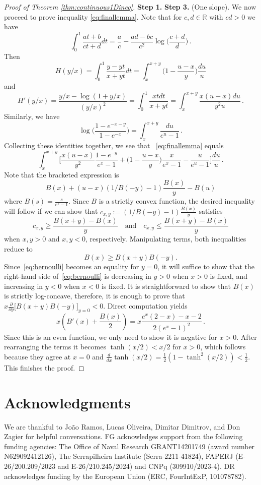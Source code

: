 \documentclass[a4paper,reqno,12pt]{amsart}
\renewcommand{\r}{\mathbb{R}}
\newcommand{\1}{\bo{1}}
\begin{document}
\begin{proof}[Proof of Theorem \ref{thm:continuous1Dineq}] {\bf Step 1. }
{\bf Step 3. }(One slope).
We now proceed to prove inequality \eqref{eq:finallemma}.
	Note that for $c,d\in \r$ with $cd>0$ we have
	\[\int_{0}^{1}\frac{at+b}{ct+d}dt = \frac{a}{c}-\frac{ad-bc}{c^2}\log\Big(\frac{c+d}{d}\Big)\,.\]
	Then
	\[H(y/x)=\int_{0}^{1}\frac{y-yt}{x+yt}dt = \int_{x}^{x+y}\Big(1-\frac{u-x}{y}\Big)\frac{du}{u}\]
	and 
	\[H'(y/x) = \frac{y/x-\log(1+y/x)}{(y/x)^2} = \int_{0}^{1}\frac{xtdt}{x+yt} = \int_{x}^{x+y}\frac{x(u-x)du}{y^2u}\,.\]
	Similarly, we have
	\[\log\Big(\frac{1-e^{-x-y}}{1-e^{-x}}\Big) = \int_{x}^{x+y}\frac{du}{e^u-1}\,.\]
	Collecting these identities together, we see that ~\eqref{eq:finallemma} equals
	\[\int_{x}^{x+y}\Big[\frac{x(u-x)}{y^2}\frac{1-e^{-y}}{e^x-1} + \Big(1-\frac{u-x}{y}\Big)\frac{x}{e^x-1}- \frac{u}{e^u-1}\Big]\frac{du}{u}\,.\]
	Note that the bracketed expression is
	\[
	B(x)+(u-x)\left(1/B(-y)-1\right)\frac{B(x)}{y}-B(u)
	\]
	where $B(s)=\frac{s}{e^s-1}$. Since $B$ is a strictly convex function, the desired inequality will follow if we can show that $c_{x,y}:=\left(1/B(-y)-1\right)\frac{B(x)}{y}$ satisfies
	\[
		c_{x,y} \geq \frac{B(x+y)-B(x)}{y}  \quad \text{and}\quad c_{x,y} \leq \frac{B(x+y)-B(x)}{y}
	\]
	when $x,y>0$ and $x,y<0$, respectively. Manipulating terms, both inequalities reduce to
	\begin{equation} \label{eq:bernoulli}
		B(x) \geq B(x+y)B(-y).
	\end{equation}
	Since~\eqref{eq:bernoulli} becomes an equality for $y=0$, it will suffice to show that the right-hand side of~\eqref{eq:bernoulli} is decreasing in $y> 0$ when $x>0$ is fixed, and increasing in $y<0$ when $x<0$ is fixed. It is straightforward to show that $B(x)$ is strictly log-concave, therefore, it is enough to prove that $x \frac{\partial}{\partial y}\Big[B(x+y)B(-y)\Big]_{y=0} < 0$. Direct computation yields
 \[
 x\left(B'(x)+\frac{B(x)}{2}\right) = x\frac{e^x(2-x)-x-2}{2(e^x-1)^2}\,.
 \]
	Since this is an even function, we only need to show it is negative for $x>0$. After rearranging the terms it becomes $\tanh(x/2)<x/2$ for $x>0$, which follows because they agree at $x=0$ and $\frac{d}{dx} \tanh(x/2) = \tfrac1{2}(1-\tanh^2(x/2)) < \tfrac1{2}$. This finishes the proof.
\end{proof}


\section*{Acknowledgments}
We are thankful to João Ramos,  Lucas Oliveira, Dimitar Dimitrov, and Don Zagier for helpful conversations.
FG acknowledges support from the following funding agencies: The Office of Naval Research GRANT14201749 (award number N629092412126), The Serrapilheira Institute (Serra-2211-41824), FAPERJ (E-26/200.209/2023 and E-26/210.245/2024) and CNPq (309910/2023-4). DR acknowledges
funding by the European Union (ERC, FourIntExP, 101078782). 
\end{document}
